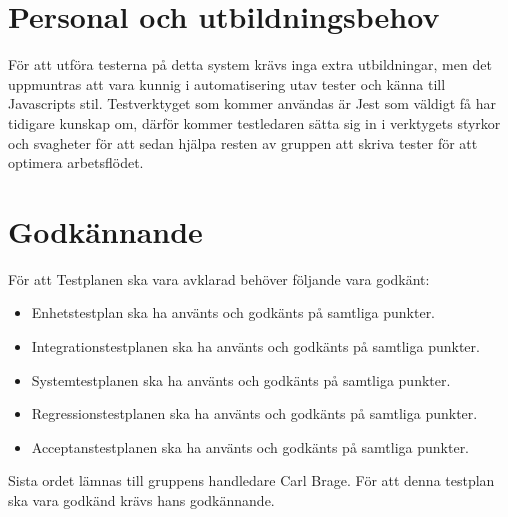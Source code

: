 \section{Personal och utbildningsbehov}
	För att utföra testerna på detta system krävs inga extra utbildningar, men det uppmuntras att vara kunnig i automatisering utav tester och känna till Javascripts stil. Testverktyget som kommer användas är Jest som väldigt få har tidigare kunskap om, därför kommer testledaren sätta sig in i verktygets styrkor och svagheter för att sedan hjälpa resten av gruppen att skriva tester för att optimera arbetsflödet.



\section{Godkännande}
	För att Testplanen ska vara avklarad behöver följande vara godkänt:
	\begin{itemize}
	 \item Enhetstestplan ska ha använts och godkänts på samtliga punkter.
	 \item Integrationstestplanen ska ha använts och godkänts på samtliga punkter.
	 \item Systemtestplanen ska ha använts och godkänts på samtliga punkter.
	 \item Regressionstestplanen ska ha använts och godkänts på samtliga punkter.
	 \item Acceptanstestplanen ska ha använts och godkänts på samtliga punkter.
	\end{itemize}
\noindent
	Sista ordet lämnas till gruppens handledare Carl Brage. För att denna testplan ska vara godkänd krävs hans godkännande.

\printbibliography


